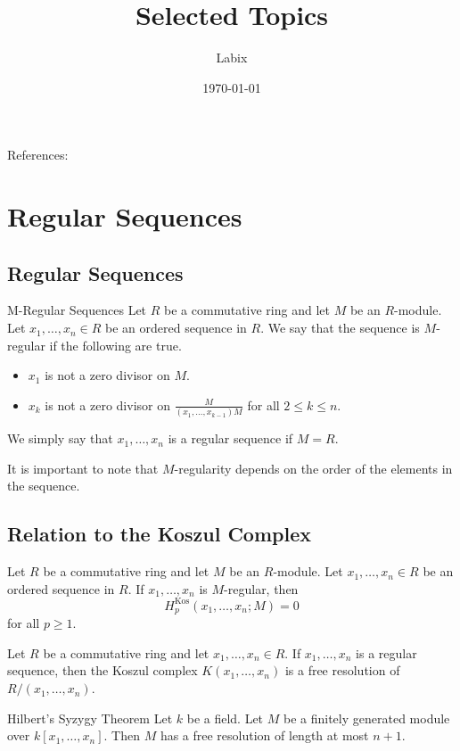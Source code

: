 \documentclass[a4paper]{article}
\title{Selected Topics}
\author{Labix}
\date{\today}
\begin{document}
\maketitle
\begin{abstract}
\end{abstract}

References: 
\pagebreak
\tableofcontents

\pagebreak
\section{Regular Sequences}
\subsection{Regular Sequences}
\begin{defn}{M-Regular Sequences}{} Let $R$ be a commutative ring and let $M$ be an $R$-module. Let $x_1,\dots,x_n\in R$ be an ordered sequence in $R$. We say that the sequence is $M$-regular if the following are true. 
\begin{itemize}
\item $x_1$ is not a zero divisor on $M$. 
\item $x_k$ is not a zero divisor on $\frac{M}{(x_1,\dots,x_{k-1})M}$ for all $2\leq k\leq n$. 
\end{itemize}
We simply say that $x_1,\dots,x_n$ is a regular sequence if $M=R$. 
\end{defn}

It is important to note that $M$-regularity depends on the order of the elements in the sequence. 

\subsection{Relation to the Koszul Complex}
\begin{thm}{}{} Let $R$ be a commutative ring and let $M$ be an $R$-module. Let $x_1,\dots,x_n\in R$ be an ordered sequence in $R$. If $x_1,\dots,x_n$ is $M$-regular, then $$H_p^\text{Kos}(x_1,\dots,x_n;M)=0$$ for all $p\geq 1$. 
\end{thm}

\begin{thm}{}{} Let $R$ be a commutative ring and let $x_1,\dots,x_n\in R$. If $x_1,\dots,x_n$ is a regular sequence, then the Koszul complex $K(x_1,\dots,x_n)$ is a free resolution of $R/(x_1,\dots,x_n)$. 
\end{thm}

\begin{thm}{Hilbert's Syzygy Theorem}{} Let $k$ be a field. Let $M$ be a finitely generated module over $k[x_1,\dots,x_n]$. Then $M$ has a free resolution of length at most $n+1$. 
\end{thm}
\end{document}
